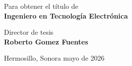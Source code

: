 \vspace{1.8cm}

\begin{center}
Para obtener el título de\\[6pt]
\textbf{Ingeniero en Tecnología Electrónica}
\end{center}

\vspace{1.8cm}

\begin{center}
Director de tesis\\[6pt]
\textbf{Roberto Gomez Fuentes}
\end{center}

\vfill

\begin{center}
Hermosillo, Sonora \hfill mayo de 2026
\end{center}


\vspace{0.5cm}




